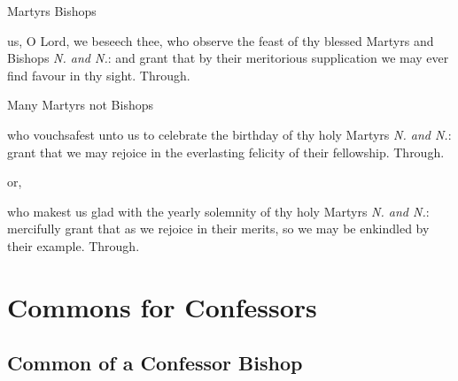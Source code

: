 \collect\label{CommonMartyrsBishopsEasterCollect}
\begin{inhead}
	Martyrs Bishops
\end{inhead}
 us, O Lord, we beseech thee, who observe the feast of thy blessed Martyrs and Bishops \textit{N. and N.}: and grant that by their meritorious supplication we may ever find favour in thy sight. Through.

\begin{inhead}\label{CommonMartyrsNotBishopsEasterCollect}
	Many Martyrs not Bishops
\end{inhead}
 who vouchsafest unto us to celebrate the birthday of thy holy Martyrs \textit{N. and N.}: grant that we may rejoice in the everlasting felicity of their fellowship. Through.
\begin{inhead}
	or,
\end{inhead}
 who makest us glad with the yearly solemnity of thy holy Martyrs \textit{N. and N.}: mercifully grant that as we rejoice in their merits, so we may be enkindled by their example. Through.



\clearpage%
\section{Commons for Confessors}

\subsection{Common of a Confessor Bishop}\label{CommonConfessorBishop}

